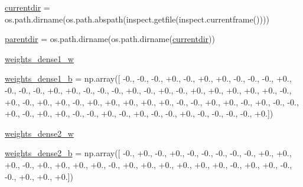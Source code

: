 \begin{DoxyCompactItemize}
\item 
\hyperlink{namespacepybullet-gym_1_1pybulletgym_1_1tests_1_1roboschool_1_1agents_1_1_inverted_pendulum_swingup_py_bullet_env__v0__2017may_a1436e6f2a734561c7a4f1946c56b5c14}{currentdir} = os.\+path.\+dirname(os.\+path.\+abspath(inspect.\+getfile(inspect.\+currentframe())))
\item 
\hyperlink{namespacepybullet-gym_1_1pybulletgym_1_1tests_1_1roboschool_1_1agents_1_1_inverted_pendulum_swingup_py_bullet_env__v0__2017may_a2ad1e7ada0df7be12227d49987e65f02}{parentdir} = os.\+path.\+dirname(os.\+path.\+dirname(\hyperlink{namespacepybullet-gym_1_1pybulletgym_1_1tests_1_1roboschool_1_1agents_1_1_inverted_pendulum_swingup_py_bullet_env__v0__2017may_a1436e6f2a734561c7a4f1946c56b5c14}{currentdir}))
\item 
\hyperlink{namespacepybullet-gym_1_1pybulletgym_1_1tests_1_1roboschool_1_1agents_1_1_inverted_pendulum_swingup_py_bullet_env__v0__2017may_acc0cfa94e4d579a6ff0666051a028089}{weights\+\_\+dense1\+\_\+w}
\item 
\hyperlink{namespacepybullet-gym_1_1pybulletgym_1_1tests_1_1roboschool_1_1agents_1_1_inverted_pendulum_swingup_py_bullet_env__v0__2017may_aa4000f360e62defafe5bdccc0f29a882}{weights\+\_\+dense1\+\_\+b} = np.\+array(\mbox{[} -\/0., -\/0., -\/0., +0., -\/0., +0., +0., -\/0., -\/0., -\/0., +0., -\/0., -\/0., -\/0., +0., +0., -\/0., -\/0., -\/0., +0., -\/0., +0., -\/0., +0., +0., +0., +0., +0., -\/0., +0., -\/0., +0., +0., -\/0., +0., +0., +0., +0., +0., -\/0., -\/0., +0., +0., -\/0., +0., -\/0., -\/0., +0., -\/0., +0., +0., -\/0., -\/0., +0., -\/0., +0., -\/0., -\/0., +0., -\/0., -\/0., -\/0., -\/0., +0.\mbox{]})
\item 
\hyperlink{namespacepybullet-gym_1_1pybulletgym_1_1tests_1_1roboschool_1_1agents_1_1_inverted_pendulum_swingup_py_bullet_env__v0__2017may_ab9666c09b106a672b0f8d3c3252ed7d9}{weights\+\_\+dense2\+\_\+w}
\item 
\hyperlink{namespacepybullet-gym_1_1pybulletgym_1_1tests_1_1roboschool_1_1agents_1_1_inverted_pendulum_swingup_py_bullet_env__v0__2017may_af1cf6607bea060d7fbc171b207fba9c7}{weights\+\_\+dense2\+\_\+b} = np.\+array(\mbox{[} -\/0., +0., -\/0., +0., -\/0., -\/0., -\/0., -\/0., -\/0., +0., +0., +0., -\/0., +0., +0., +0., +0., -\/0., +0., +0., +0., +0., +0., +0., -\/0., +0., +0., -\/0., -\/0., +0., +0., +0.\mbox{]})

\end{DoxyCompactItemize}
